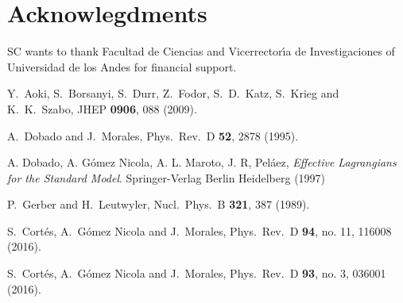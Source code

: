 \documentclass{PoS}
\begin{document}
\section*{Acknowlegdments}

SC wants to thank Facultad de Ciencias and Vicerrector\'{\i}a de Investigaciones of Universidad de los Andes for financial support.


\begin{thebibliography}{99}
  Y.~Aoki, S.~Borsanyi, S.~Durr, Z.~Fodor, S.~D.~Katz, S.~Krieg and K.~K.~Szabo,
  JHEP {\bf 0906}, 088 (2009).
	
  A.~Dobado and J.~Morales,
  Phys.\ Rev.\ D {\bf 52}, 2878 (1995).
	
A. Dobado, A. G\'omez Nicola, A. L. Maroto, J. R, Pel\'aez, \emph{Effective Lagrangians for the Standard Model}. Springer-Verlag Berlin Heidelberg (1997)
	
	
  P.~Gerber and H.~Leutwyler,
  Nucl.\ Phys.\  B {\bf 321}, 387 (1989).
	
	
  S.~Cort\'es, A.~G\'omez Nicola and J.~Morales,
  Phys.\ Rev.\ D {\bf 94}, no. 11, 116008 (2016).
	

  S.~Cort\'es, A.~G\'omez Nicola and J.~Morales,
  Phys.\ Rev.\ D {\bf 93}, no. 3, 036001 (2016).


\end{thebibliography}
\end{document}
